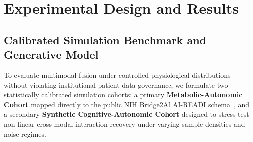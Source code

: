 \documentclass[journal,10pt,twocolumn]{IEEEtran}
\begin{document}
\section{Experimental Design and Results}
\label{sec:experiments}

\subsection{Calibrated Simulation Benchmark and Generative Model}
\label{sec:cohort_setup}
To evaluate multimodal fusion under controlled physiological distributions without violating institutional patient data governance, we formulate two statistically calibrated simulation cohorts: a primary \textbf{Metabolic-Autonomic Cohort} mapped directly to the public NIH Bridge2AI AI-READI schema~\cite{aireadi2024}, and a secondary \textbf{Synthetic Cognitive-Autonomic Cohort} designed to stress-test non-linear cross-modal interaction recovery under varying sample densities and noise regimes.
\end{document}
